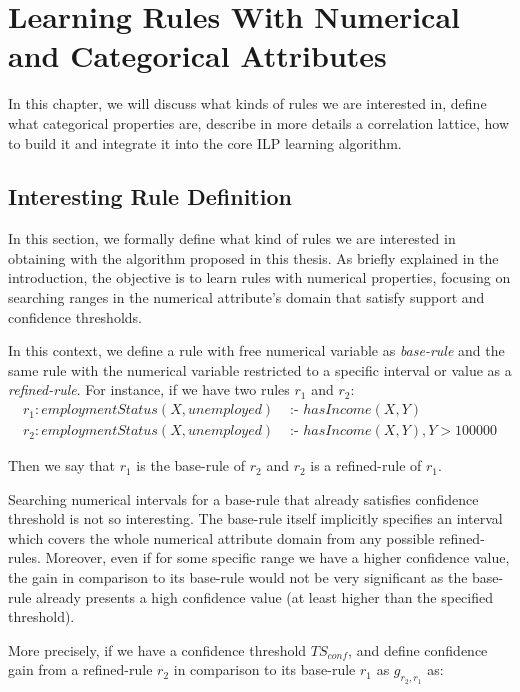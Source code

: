 \chapter{Learning Rules With Numerical and Categorical Attributes}
\label{cl:intro}

In this chapter, we will discuss what kinds of rules we are interested in, define what categorical properties are,
describe in more details a correlation lattice, how to build it and integrate it into the core ILP learning
algorithm.

\section{Interesting Rule Definition}

In this section, we formally define what kind of rules we are interested in obtaining with the algorithm proposed in
this thesis. As briefly explained in the introduction, the objective is to learn rules with numerical properties,
focusing on searching ranges in the numerical attribute's domain that satisfy support and confidence thresholds.

In this context, we define a rule with free numerical variable as \emph{base-rule} and the same rule with the
numerical variable restricted to a specific interval or value as a \emph{refined-rule}. For instance, if we have
two rules $r_1$ and $r_2$:
\begin{align*}
r_1: employmentStatus(X,unemployed)&\text{ :- }hasIncome(X,Y) \\
r_2: employmentStatus(X,unemployed)&\text{ :- }hasIncome(X,Y),Y>100000
\end{align*}

Then we say that $r_1$ is the base-rule of $r_2$ and $r_2$ is a refined-rule of $r_1$.

Searching numerical intervals for a base-rule that already satisfies confidence threshold is not so interesting. The
base-rule itself implicitly specifies an interval which covers the whole numerical attribute domain from any possible
refined-rules. Moreover, even if for some specific range we have a higher confidence value, the gain in comparison to
its base-rule would not be very significant as the base-rule already presents a high confidence value (at least higher
than the specified threshold).

More precisely, if we have a confidence threshold $TS_{conf}$, and define confidence gain from a refined-rule
$r_2$ in comparison to its base-rule $r_1$ as $g_{r_2,r_1}$ as:

